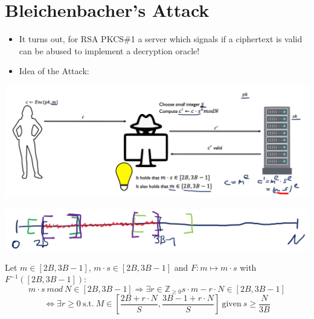     \section{Bleichenbacher's Attack}
        \begin{itemize}
            \item It turns out, for RSA PKCS$\#$1 a server which signals if a ciphertext is valid can be abused to implement a decryption oracle!
            \item Idea of the Attack:
        \end{itemize}
        \begin{center}
	        \includegraphics[width=160mm]{Graphics/Chosen Ciphertext Secure Public Key Encryption/cca3.png}
        \end{center}
        \begin{center}
	        \includegraphics[width=160mm]{Graphics/Chosen Ciphertext Secure Public Key Encryption/cca4.png}
        \end{center}
        Let $m \in [2B,3B-1]$, $m \cdot s \in [2B,3B-1]$ and $F: m \mapsto m \cdot s$ with $F^{-1}([2B,3B-1])$:
        $$m \cdot s \ mod\ N \in [2B,3B-1] \Rightarrow \exists r \in \mathbb{Z}_{\geq 0} s\cdot m - r \cdot N \in [2B,3B-1]$$
        $$\Leftrightarrow \exists r \geq 0 \ \text{s.t.}\  M \in [\frac{2B + r \cdot N}{S},\frac{3B-1 + r \cdot N}{S}] \  \text{given}\  s \geq \frac{N}{3B}$$

\newpage

